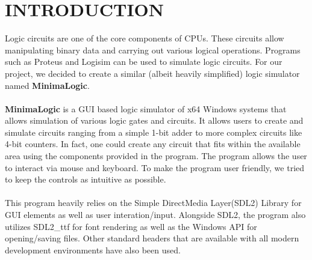 \documentclass[report]{subfiles}
\begin{document}
\chapter{INTRODUCTION}
    Logic circuits are one of the core components of CPUs. These circuits allow manipulating binary data and carrying out various logical operations.
    Programs such as Proteus and Logisim can be used to simulate logic circuits.
    For our project, we decided to create a similar (albeit heavily simplified) logic simulator named \textbf{MinimaLogic}.
    \\\\
    \textbf{MinimaLogic} is a GUI based logic simulator of x64 Windows systems that allows simulation of various logic gates and circuits.
    It allows users to create and simulate circuits ranging from a simple 1-bit adder to more complex circuits like 4-bit counters.
    In fact, one could create any circuit that fits within the available area using the components provided in the program.
    The program allows the user to interact via mouse and keyboard. To make the program user friendly, we tried to keep the controls as intuitive as possible.
    \\\\
    This program heavily relies on the Simple DirectMedia Layer(SDL2) Library for GUI elements as well as user interation/input. 
    Alongside SDL2, the program also utilizes SDL2\_ttf for font rendering as well as the Windows API for opening/saving files.
    Other standard headers that are available with all modern development environments have also been used.
\end{document}
